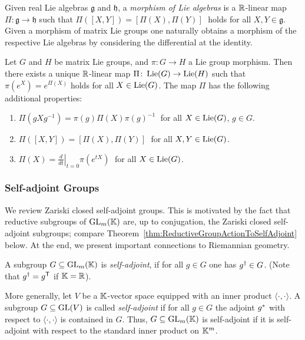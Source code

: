Given real Lie algebras $\mathfrak{g}$ and $\mathfrak{h}$, a \emph{morphism of Lie algebras} is a $\mathbb R$-linear map $\Pi \colon \mathfrak{g} \to \mathfrak{h}$ such that $\Pi([X,Y]) = [\Pi(X), \Pi(Y)] \;$ holds for all $X, Y \in \mathfrak{g}$. Given a morphism of matrix Lie groups one naturally obtains a morphism of the respective Lie algebras by considering the differential at the identity.

\begin{theorem} \label{thm:Differential}
	Let $G$ and $H$ be matrix Lie groups, and $\pi \colon G \to H$ a Lie group morphism. Then there exists a unique $\mathbb R$-linear map $\Pi \colon \operatorname{Lie}(G) \to \operatorname{Lie}(H)$ such that
		$\pi(e^X) = e^{\Pi(X)}$
	holds for all $X \in \operatorname{Lie}(G)$. The map $\Pi$ has the following additional properties:
		\begin{enumerate}\itemsep 1pt
			\item $\Pi(gXg^{-1}) = \pi(g)\Pi(X)\pi(g)^{-1} \;$ for all $X \in \operatorname{Lie}(G)$, $g \in G$.
			
			\item $\Pi([X,Y]) = [\Pi(X), \Pi(Y)] \;$ for all $X, Y \in \operatorname{Lie}(G)$.
			
			\item $\Pi(X) =  \left.  \frac{d}{dt} \right\vert_{t=0}   \pi(e^{tX}) \;$ for all $X \in \operatorname{Lie}(G)$.
		\end{enumerate}
\end{theorem}



\subsubsection{Self-adjoint Groups}

We review Zariski closed self-adjoint groups. This is motivated by the fact that reductive subgroups of $\operatorname{GL}_m(\mathbb K)$ are, up to conjugation, the Zariski closed self-adjoint subgroups; compare Theorem~\ref{thm:ReductiveGroupActionToSelfAdjoint} below. 
At the end, we present important connections to Riemannian geometry. 

\begin{defn}\label{defn:SelfAdjoint}
	A subgroup $G \subseteq \operatorname{GL}_m(\mathbb K)$ is \emph{self-adjoint}, if for all $g \in G$ one has $g^{\dagger} \in G$. (Note that $g^{\dagger} = g^{\mathsf{T}}$ if $\mathbb K = \mathbb R$).

	More generally, let $V$ be a $\mathbb K$-vector space equipped with an inner product $\langle \cdot , \cdot \rangle$. A subgroup $G \subseteq \operatorname{GL}(V)$ is called \emph{self-adjoint} if for all $g \in G$ the adjoint $g^{\ast}$ with respect to $\langle \cdot , \cdot \rangle$ is contained in $G$.
	Thus, $G \subseteq \operatorname{GL}_m(\mathbb K)$ is self-adjoint if it is self-adjoint with respect to the standard inner product on $\mathbb K^m$.
	\hfill{}
\end{defn}

